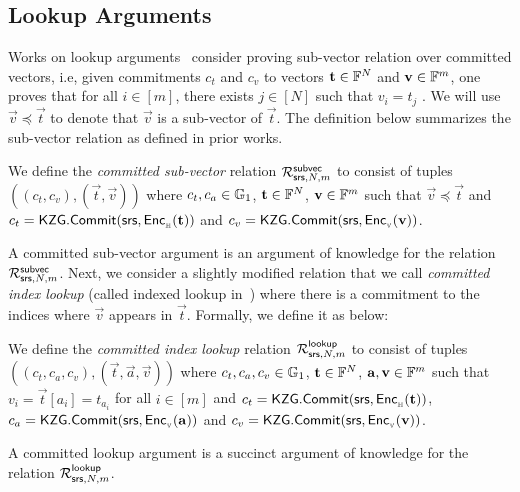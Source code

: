
 


\subsection{Lookup Arguments}
Works on lookup arguments~\cite{CCS:ZBKMNS22,EPRINT:PosKat22,EPRINT:ZGKMR22,EPRINT:EagFioGab22}
consider proving sub-vector relation over committed vectors, i.e, given commitments $c_t$ and $c_v$ to vectors $\mathbf{t}\in \mathbb{F}^N$
and $\mathbf{v}\in \mathbb{F}^m$, one proves that for all $i\in [m]$, there exists $j\in [N]$ such that $v_i=t_j$ . We will use
$\vec{v}\preceq \vec{t}$ to denote that $\vec{v}$ is a sub-vector of $\vec{t}$.
The definition below summarizes the sub-vector relation as defined in prior works.
\begin{definition}
\label{defn:comm-subvec}
We define the {\em committed sub-vector} relation $\mathcal{R}^{\mathsf{subvec}}_{\mathsf{srs},N,m}$ to consist of tuples
$((c_t, c_v), (\vec{t}, \vec{v}))$ where $c_t,c_a\in \mathbb{G}_1$, $\mathbf{t}\in \mathbb{F}^N$, $\mathbf{v}\in \mathbb{F}^m$ such that
$\vec{v}\preceq \vec{t}$ and $c_t=\mathsf{KZG.Commit}(\mathsf{srs},\mathsf{Enc}_{{}_{\mathbb{H}}}(\mathbf{t}))$ and $c_v=\mathsf{KZG.Commit}(\mathsf{srs},\mathsf{Enc}_{{}_{\mathbb{V}}}(\mathbf{v}))$.
\end{definition}
A committed sub-vector argument is an argument of knowledge for the relation $\mathcal{R}^{\mathsf{subvec}}_{\mathsf{srs},N,m}$.
Next, we consider a slightly modified relation that we call {\em committed index lookup} (called indexed lookup in~\cite{lasso})
where there is a commitment to the indices where $\vec{v}$ appears in $\vec{t}$. Formally, we define it as below:

\begin{definition}
\label{defn:comm-index-lookup}
We define the {\em committed index lookup} relation $\mathcal{R}^{\mathsf{lookup}}_{\mathsf{srs},N,m}$ to consist of tuples
$((c_t,c_a,c_v),(\vec{t},\vec{a},\vec{v}))$ where $c_t,c_a,c_v\in \mathbb{G}_1$, $\mathbf{t}\in \mathbb{F}^N$, $\mathbf{a},\mathbf{v}\in \mathbb{F}^m$ such
that $v_i = \vec{t}[a_i]=t_{a_i}$ for all $i\in [m]$ and $c_t = \mathsf{KZG.Commit}(\mathsf{srs}, \mathsf{Enc}_{{}_{\mathbb{H}}}(\mathbf{t}))$, $c_a=\mathsf{KZG.Commit}(\mathsf{srs},\mathsf{Enc}_{{}_{\mathbb{V}}}(\mathbf{a}))$
and $c_v=\mathsf{KZG.Commit}(\mathsf{srs},\mathsf{Enc}_{{}_{\mathbb{V}}}(\mathbf{v}))$.
\end{definition}

A committed lookup argument is a succinct argument of knowledge for the relation $\mathcal{R}^{\mathsf{lookup}}_{\mathsf{srs},N,m}$. 